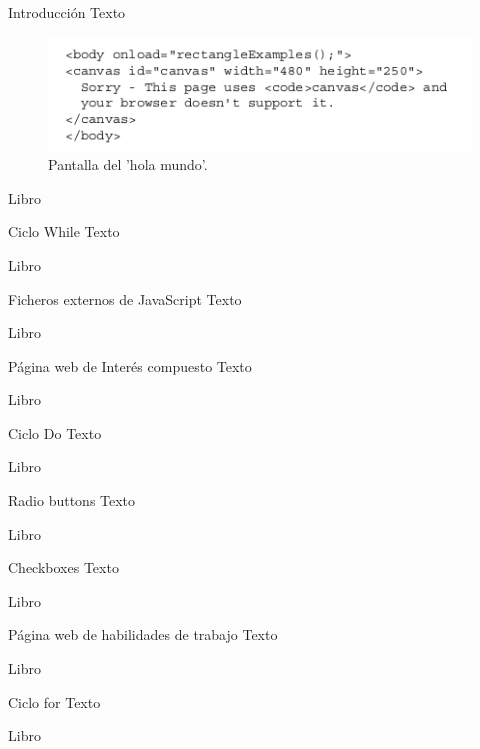 \begin{frame}{Introducción}
\justifying
Texto

\begin{figure}[H]
\centering
\includegraphics[scale=0.5]{Section_Files/images/Sec01/01.png}
\caption{Pantalla del 'hola mundo'.}
\end{figure}

{\tiny Libro}
\end{frame}

\begin{frame}{Ciclo While}
\justifying
Texto

{\tiny Libro}
\end{frame}

\begin{frame}{Ficheros externos de JavaScript}
\justifying
Texto

{\tiny Libro}
\end{frame}

\begin{frame}{Página web de Interés compuesto}
\justifying
Texto

{\tiny Libro}
\end{frame}

\begin{frame}{Ciclo Do}
\justifying
Texto

{\tiny Libro}
\end{frame}

\begin{frame}{Radio buttons}
\justifying
Texto

{\tiny Libro}
\end{frame}

\begin{frame}{Checkboxes}
\justifying
Texto

{\tiny Libro}
\end{frame}

\begin{frame}{Página web de habilidades de trabajo}
\justifying
Texto

{\tiny Libro}
\end{frame}

\begin{frame}{Ciclo for}
\justifying
Texto

{\tiny Libro}
\end{frame}

